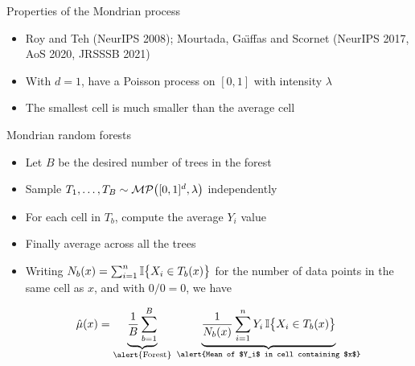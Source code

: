 \documentclass{beamer}
\begin{document}
\begin{frame}{Properties of the Mondrian process}
  \begin{itemize}
    \item
      Roy and Teh (NeurIPS 2008);
      Mourtada, Ga{\"\i}ffas and Scornet
      (NeurIPS 2017, AoS 2020, JRSSSB 2021)
      \nocite{roy2008mondrian}
      \nocite{mourtada2017universal}
      \nocite{mourtada2020minimax}
      \nocite{mourtada2021amf}
    \item With $d=1$, have a Poisson process
      on $[0,1]$ with intensity $\lambda$
    \item The smallest cell is much smaller than
      the average cell
  \end{itemize}
\end{frame}

\begin{frame}{Mondrian random forests}

  \vspace*{4mm}
  \begin{itemize}
    \item Let $B$ be the desired number of trees in the forest
    \item Sample
      $T_1, \ldots, T_B \sim \mathcal{MP}\big([0,1]^d, \lambda\big)$
      \alert{independently}
    \item For each cell in $T_b$,
      compute the average $Y_i$ value
    \item Finally average across all the trees

    \item
      Writing $N_b(x) = \sum_{i=1}^n \mathbb{I}\big\{ X_i \in T_b(x) \big\}$
      for the number of data points in the same cell as $x$,
      and with $0/0 = 0$, we have
      \vspace*{3mm}
      \begin{definition}%
        \vspace*{-3mm}
        \begin{align*}
          \hat\mu(x)
          =
          \underbrace{
            \frac{1}{B} \sum_{b=1}^B
          }_{\text{\alert{Forest}}}
          \hspace*{1mm}
          \underbrace{
            \frac{1}{N_b(x)}
            \sum_{i=1}^n Y_i \,
            \I\big\{ X_i \in T_b(x) \big\}
            \vphantom{\frac{1}{B} \sum_{b=1}^B}
          }_{\text{\alert{Mean of $Y_i$ in cell containing $x$}}}
        \end{align*}
        \vspace*{-4mm}
      \end{definition}

  \end{itemize}

\end{frame}
\end{document}
